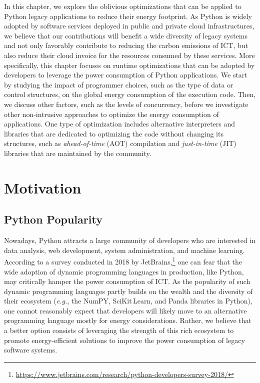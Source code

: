 In this chapter, we explore the oblivious optimizations that can be applied to Python legacy applications to reduce their energy footprint.
As Python is widely adopted by software services deployed in public and private cloud infrastructures, we believe that our contributions will benefit a wide diversity of legacy systems and not only favorably contribute to reducing the carbon emissions of ICT, but also reduce their cloud invoice for the resources consumed by these services.
More specifically, this chapter focuses on runtime optimizations that can be adopted by developers to leverage the power consumption of Python applications.
We start by studying the impact of programmer choices, such as the type of data or control structures, on the global energy consumption of the execution code.
Then, we discuss other factors, such as the levels of concurrency, before we investigate other non-intrusive approaches to optimize the energy consumption of applications.
One type of optimization includes alternative interpreters and libraries that are dedicated to optimizing the code without changing its structures, such as \emph{ahead-of-time} (AOT) compilation and \emph{just-in-time} (JIT) libraries that are maintained by the community.


\section{Motivation}

\subsection{Python Popularity}
Nowadays, Python attracts a large community of developers who are interested in data analysis, web development, system administration, and machine learning.
According to a survey conducted in 2018 by JetBrains,\footnote{\url{https://www.jetbrains.com/research/python-developers-survey-2018/}} one can fear that the wide adoption of dynamic programming languages in production, like Python, may critically hamper the power consumption of ICT.
As the popularity of such dynamic programming languages partly builds on the wealth and the diversity of their ecosystem (\emph{e.g.}, the NumPY, SciKit\,Learn, and Panda libraries in Python), one cannot reasonably expect that developers will likely move to an alternative programming language mostly for energy considerations.
Rather, we believe that a better option consists of leveraging the strength of this rich ecosystem to promote energy-efficient solutions to improve the power consumption of legacy software systems.

